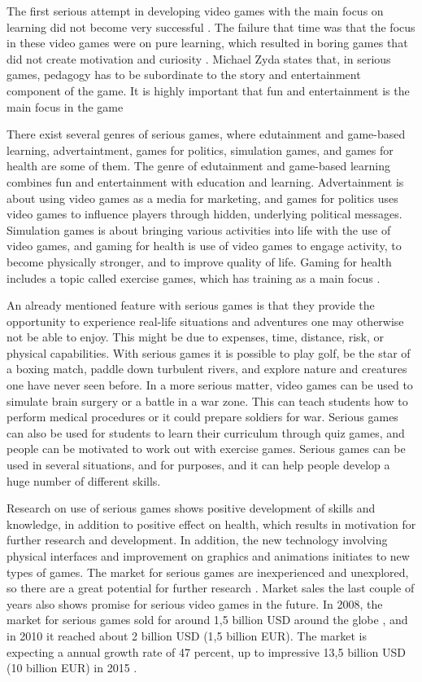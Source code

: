 The first serious attempt in developing video games with the main focus on learning did not become very successful \cite{understandingvg}. The failure that time was that the focus in these  video games were on pure learning, which resulted in boring games that did not create motivation and curiosity \cite{understandingvg} \cite{susi2007serious}. Michael Zyda states that, in serious games, pedagogy has to be subordinate to the story and entertainment component of the game. It is highly important that fun and entertainment is the main focus in the game \cite{zyda2005visual}

There exist several genres of serious games, where edutainment and game-based learning, advertaintment, games for politics, simulation games, and games for health are some of them. The genre of edutainment and game-based learning combines fun and entertainment with education and learning. Advertainment is about using video games as a media for marketing, and games for politics uses video games to influence players through hidden, underlying political messages. Simulation games is about bringing various activities into life with the use of video games, and gaming for health is use of video games to engage activity, to become physically stronger, and to improve quality of life. Gaming for health includes a topic called exercise games, which has training as a main focus \cite{understandingvg} \cite{alfingewang}.

An already mentioned feature with serious games is that they provide the opportunity to experience real-life situations and adventures one may otherwise not be able to enjoy. This might be due to expenses, time, distance, risk, or physical capabilities. With serious games it is possible to play golf, be the star of a boxing match, paddle down turbulent rivers, and explore nature and creatures one have never seen before. In a more serious matter, video games can be used to simulate brain surgery or a battle in a war zone. This can teach students how to perform medical procedures or it could prepare soldiers for war. Serious games can also be used for students to learn their curriculum through quiz games, and people can be motivated to work out with exercise games. Serious games can be used in several situations, and for purposes, and it can help people develop a huge number of different skills. 

Research on use of serious games shows positive development of skills and knowledge, in addition to positive effect on health, which results in motivation for further research and development. In addition, the new technology involving physical interfaces and improvement on graphics and animations initiates to new types of games. The market for serious games are inexperienced and unexplored, so there are a great potential for further research \cite{alfingewang}. Market sales the last couple of years also shows promise for serious video games in the future. In 2008, the market for serious games sold for around 1,5 billion USD around the globe \cite{alfingewang}, and in 2010 it reached about 2 billion USD (1,5 billion EUR). The market is expecting a annual growth rate of 47 percent, up to impressive 13,5 billion USD (10 billion EUR) in 2015 \cite{idate}. 

